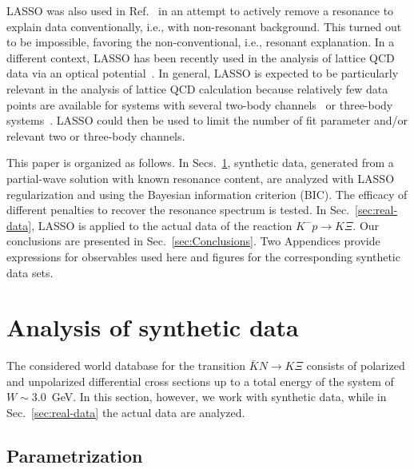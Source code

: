 \documentclass[10pt,aps,prc,superscriptaddress,twoside,twocolumn,nofootinbib,showpacs,preprintnumbers]{revtex4-1}
\begin{document}
LASSO was also used in Ref.~\cite{Sadasivan:2018jig} in an attempt to actively remove a resonance to explain data conventionally, i.e., with non-resonant background. This turned out to be impossible, favoring the non-conventional, i.e., resonant explanation. In a different context, LASSO has been recently used in the analysis of lattice QCD data via an optical potential~\cite{Agadjanov:2016mao}. In general, LASSO is expected to be particularly relevant in the analysis of lattice QCD calculation because relatively few data points are available for systems with several two-body channels~\cite{Briceno:2017qmb, Guo:2016zep, Wilson:2015dqa, Doring:2013glu, Doring:2011ip} or three-body systems~\cite{Mai:2018djl, Doring:2018xxx, Mai:2017bge,  Briceno:2016mjc, Hammer:2017kms, Hammer:2017uqm}. LASSO could then be used to limit the number of fit parameter and/or relevant two or three-body channels.

This paper is organized as follows. In Secs.~\ref{sec:formalism}, synthetic data, generated from a partial-wave solution with known resonance content, are analyzed with LASSO regularization and using the Bayesian information criterion (BIC). The efficacy of different penalties to recover the resonance spectrum is tested. In Sec.~\ref{sec:real-data}, LASSO is applied to the actual data of the reaction $K^-p\to K\Xi$. 
Our conclusions are presented in Sec.~\ref{sec:Conclusions}. Two Appendices provide expressions for observables used here and figures for the corresponding synthetic data sets.

\section{Analysis of synthetic data}
\label{sec:formalism}
The considered world database for the transition $\bar KN\to K\Xi$ consists of polarized and unpolarized differential cross sections up to a total energy of the system of  ${W\sim 3.0}$~GeV. In this section, however, we work with synthetic data, while in Sec.~\ref{sec:real-data} the actual data are analyzed.

\subsection{Parametrization}
\label{subsec:parametrization}
\end{document}
